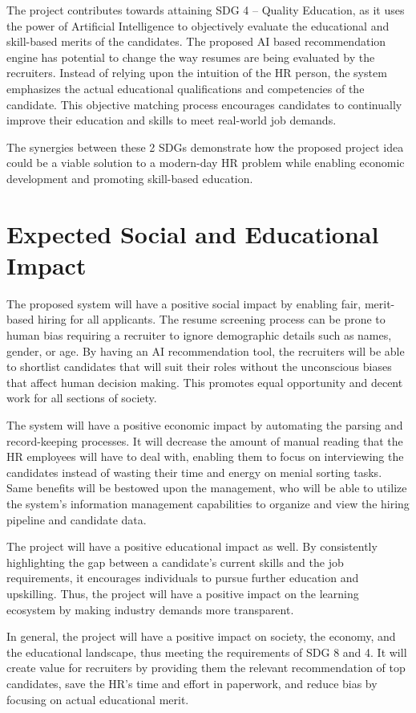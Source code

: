 \documentclass[12pt,a4paper]{report}
\begin{document}
The project contributes towards attaining SDG 4 – Quality Education, as it uses the power of Artificial Intelligence to objectively evaluate the educational and skill-based merits of the candidates. The proposed AI based recommendation engine has potential to change the way resumes are being evaluated by the recruiters. Instead of relying upon the intuition of the HR person, the system emphasizes the actual educational qualifications and competencies of the candidate. This objective matching process encourages candidates to continually improve their education and skills to meet real-world job demands.

The synergies between these 2 SDGs demonstrate how the proposed project idea could be a viable solution to a modern-day HR problem while enabling economic development and promoting skill-based education.

\section{Expected Social and Educational Impact}
The proposed system will have a positive social impact by enabling fair, merit-based hiring for all applicants. The resume screening process can be prone to human bias requiring a recruiter to ignore demographic details such as names, gender, or age. By having an AI recommendation tool, the recruiters will be able to shortlist candidates that will suit their roles without the unconscious biases that affect human decision making. This promotes equal opportunity and decent work for all sections of society.

The system will have a positive economic impact by automating the parsing and record-keeping processes. It will decrease the amount of manual reading that the HR employees will have to deal with, enabling them to focus on interviewing the candidates instead of wasting their time and energy on menial sorting tasks. Same benefits will be bestowed upon the management, who will be able to utilize the system's information management capabilities to organize and view the hiring pipeline and candidate data.

The project will have a positive educational impact as well. By consistently highlighting the gap between a candidate's current skills and the job requirements, it encourages individuals to pursue further education and upskilling. Thus, the project will have a positive impact on the learning ecosystem by making industry demands more transparent.

In general, the project will have a positive impact on society, the economy, and the educational landscape, thus meeting the requirements of SDG 8 and 4. It will create value for recruiters by providing them the relevant recommendation of top candidates, save the HR's time and effort in paperwork, and reduce bias by focusing on actual educational merit.
\end{document}
